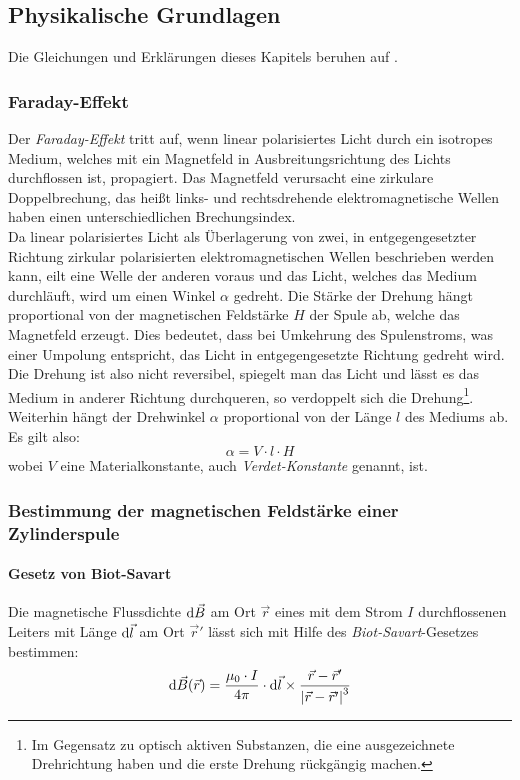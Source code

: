 \subsection{Physikalische Grundlagen}
Die Gleichungen und Erklärungen dieses Kapitels beruhen auf \cite{herrmann}.
\subsubsection{Faraday-Effekt}
Der \emph{Faraday-Effekt} tritt auf, wenn linear polarisiertes Licht durch ein isotropes Medium, welches mit ein Magnetfeld in 
Ausbreitungsrichtung des Lichts durchflossen ist, propagiert. Das Magnetfeld verursacht eine zirkulare Doppelbrechung, das heißt links- und 
rechtsdrehende elektromagnetische Wellen haben einen unterschiedlichen Brechungsindex. \\
Da linear polarisiertes Licht als Überlagerung von zwei, in entgegengesetzter Richtung zirkular polarisierten elektromagnetischen Wellen 
beschrieben werden kann, eilt eine Welle der anderen voraus und das Licht, welches das Medium durchläuft, wird um einen Winkel $\alpha$ gedreht. 
Die Stärke der Drehung hängt proportional von der magnetischen Feldstärke $H$ der Spule ab, welche das Magnetfeld erzeugt. 
Dies bedeutet, dass bei Umkehrung des Spulenstroms, was einer Umpolung entspricht, das Licht in entgegengesetzte Richtung gedreht wird. 
Die Drehung ist also nicht reversibel, spiegelt man das Licht und lässt es das Medium in anderer Richtung durchqueren, 
so verdoppelt sich die Drehung\footnote{Im Gegensatz zu optisch aktiven Substanzen, die eine ausgezeichnete Drehrichtung haben 
und die erste Drehung rückgängig machen.}. Weiterhin hängt der Drehwinkel $\alpha$ proportional von der Länge $l$ des Mediums ab.
Es gilt also:
\begin{equation}
\label{eq:faraday}
  \alpha = V \cdot l \cdot H
\end{equation}
wobei $V$ eine Materialkonstante, auch \emph{Verdet-Konstante} genannt, ist.

\subsubsection{Bestimmung der magnetischen Feldstärke einer Zylinderspule}
\paragraph{Gesetz von Biot-Savart}
Die magnetische Flussdichte $\mathrm{d} \vec{B}$ am Ort $\vec{r}$ eines mit dem Strom $I$ durchflossenen Leiters mit Länge $\mathrm{d} \vec{l}$ 
am Ort $\vec{r}'$ lässt sich mit Hilfe des \emph{Biot-Savart}-Gesetzes bestimmen:
\begin{equation}
  \label{eq:biotsavart}
  \mathrm{d} \vec{B}(\vec{r}) = \frac{\mu_0 \cdot I}{4 \pi} \cdot \mathrm{d} \vec{l} \times \frac{\vec{r} - \vec{r}'}{\left|\vec{r} - \vec{r}'\right|^3}
\end{equation}
